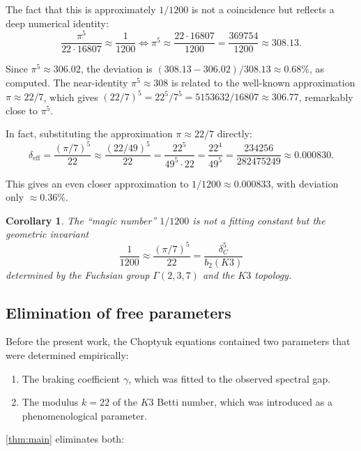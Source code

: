 \documentclass[12pt,a4paper]{article}
\newtheorem{corollary}[theorem]{Corollary}
\theoremstyle{definition}
\theoremstyle{remark}
\begin{document}
The fact that this is approximately $1/1200$ is not a coincidence but reflects a deep numerical identity:
\begin{equation}
\frac{\pi^5}{22 \cdot 16807} \approx \frac{1}{1200} \iff \pi^5 \approx \frac{22 \cdot 16807}{1200} = \frac{369754}{1200} \approx 308.13.
\end{equation}

Since $\pi^5 \approx 306.02$, the deviation is $(308.13 - 306.02)/308.13 \approx 0.68\%$, as computed. The near-identity $\pi^5 \approx 308$ is related to the well-known approximation $\pi \approx 22/7$, which gives $(22/7)^5 = 22^5/7^5 = 5153632/16807 \approx 306.77$, remarkably close to $\pi^5$.

In fact, substituting the approximation $\pi \approx 22/7$ directly:
\begin{equation}
\delta_{\mathrm{eff}} = \frac{(\pi/7)^5}{22} \approx \frac{(22/49)^5}{22} = \frac{22^5}{49^5 \cdot 22} = \frac{22^4}{49^5} = \frac{234256}{282475249} \approx 0.000830.
\end{equation}

This gives an even closer approximation to $1/1200 \approx 0.000833$, with deviation only $\approx 0.36\%$.

\begin{corollary}
\label{cor:magic}
The ``magic number'' $1/1200$ is not a fitting constant but the geometric invariant
\begin{equation}
\frac{1}{1200} \approx \frac{(\pi/7)^5}{22} = \frac{\delta_C^5}{b_2(K3)}
\end{equation}
determined by the Fuchsian group $\Gamma(2,3,7)$ and the $K3$ topology.
\end{corollary}

\subsection{Elimination of free parameters}

Before the present work, the Choptyuk equations contained two parameters that were determined empirically:
\begin{enumerate}
\item The braking coefficient $\gamma$, which was fitted to the observed spectral gap.
\item The modulus $k = 22$ of the $K3$ Betti number, which was introduced as a phenomenological parameter.
\end{enumerate}

\cref{thm:main} eliminates both:
\end{document}
